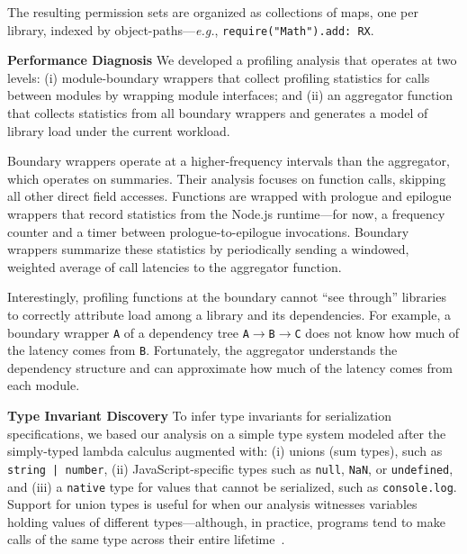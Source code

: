 \documentclass[letterpaper,twocolumn,10pt]{article}
\def\eg{{\em e.g.}, }
\newcommand{\heading}[1]{\vspace{2pt}\noindent\textbf{#1}\enspace}
\newcommand{\ttt}[1]{\texttt{#1}}
\begin{document}
The resulting permission sets are organized as collections of maps, one per library, indexed by object-paths---\eg \ttt{require("Math").add: RX}.

\heading{Performance Diagnosis}
We developed a profiling analysis that operates at two levels:
 (i) module-boundary wrappers that collect profiling statistics for calls between modules by wrapping module interfaces; and
 (ii) an aggregator function that collects statistics from all boundary wrappers and generates a model of library load under the current workload.

Boundary wrappers operate at a higher-frequency intervals than the aggregator, which operates on summaries.
Their analysis focuses on function calls, skipping all other direct field accesses.
Functions are wrapped with prologue and epilogue wrappers that record statistics from the Node.js runtime---for now, a frequency counter and a timer between prologue-to-epilogue invocations.
Boundary wrappers summarize these statistics by periodically sending a windowed, weighted average of call latencies to the aggregator function.


Interestingly, profiling functions at the boundary cannot ``see through'' libraries to correctly attribute load among a library and its dependencies.
For example, a boundary wrapper \ttt{A} of a dependency tree \ttt{A}$\rightarrow$\ttt{B}$\rightarrow$\ttt{C} does not know how much of the latency comes from \ttt{B}.
Fortunately, the aggregator understands the dependency structure and can approximate how much of the latency comes from each module.


\heading{Type Invariant Discovery}
To infer type invariants for serialization specifications, we based our analysis on a simple type system modeled after the simply-typed lambda calculus augmented with:
  (i) unions (sum types), such as \ttt{string | number}, 
  (ii) JavaScript-specific types such as \ttt{null}, \ttt{NaN}, or \ttt{undefined}, and
  (iii) a \ttt{native} type for values that cannot be serialized, such as \ttt{console.log}.
Support for union types is useful for when our analysis witnesses variables holding values of different types---although, in practice,  programs tend to make calls of the same type across their entire lifetime~\cite{daikon}.
\end{document}
